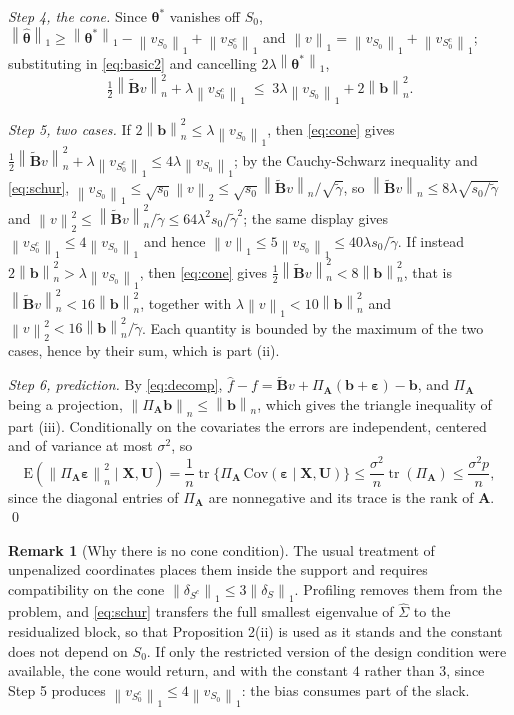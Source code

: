 \documentclass[10pt]{book}
\theoremstyle{definition}
\newtheorem{remark}{Remark}[section]
\newcommand{\E}{\mathrm{E}}
\newcommand{\norm}[1]{\left\lVert #1 \right\rVert}
\newcommand{\normn}[1]{\left\lVert #1 \right\rVert_{n}}
\newcommand{\bX}{\mathbf{X}}
\newcommand{\bU}{\mathbf{U}}
\newcommand{\btheta}{\boldsymbol{\theta}}
\newcommand{\thetastar}{\btheta^{*}}
\newcommand{\thetahat}{\widehat{\btheta}}
\newcommand{\Gramhat}{\widehat{\Sigma}}
\newcommand{\pen}{\lambda}
\newcommand{\Szero}{S_{0}}
\newcommand{\Amat}{\mathbf{A}}
\newcommand{\Bmat}{\mathbf{B}}
\newcommand{\Btil}{\widetilde{\Bmat}}
\newcommand{\PA}{\Pi_{\Amat}}
\newcommand{\bveps}{\boldsymbol{\varepsilon}}
\newcommand{\bb}{\mathbf{b}}
\newcommand{\gtil}{\widetilde{\gamma}}
\DeclareMathOperator{\tr}{tr}
\begin{document}
{\emph{Step 4, the cone.} Since $\thetastar$ vanishes off $\Szero$,
$\norm{\thetahat}_1 \ge \norm{\thetastar}_1 - \norm{v_{\Szero}}_1 +
\norm{v_{\Szero^c}}_1$ and
$\norm{v}_1 = \norm{v_{\Szero}}_1+\norm{v_{\Szero^c}}_1$; substituting in
\eqref{eq:basic2} and cancelling $2\pen\norm{\thetastar}_1$,
\begin{equation}
  \label{eq:cone}
  \tfrac12\normn{\Btil v}^2 + \pen\norm{v_{\Szero^c}}_1
  \;\le\; 3\pen\norm{v_{\Szero}}_1 + 2\normn{\bb}^2 .
\end{equation}

\emph{Step 5, two cases.} If $2\normn{\bb}^2 \le \pen\norm{v_{\Szero}}_1$,
then \eqref{eq:cone} gives
$\tfrac12\normn{\Btil v}^2 + \pen\norm{v_{\Szero^c}}_1 \le
4\pen\norm{v_{\Szero}}_1$; by the Cauchy-Schwarz inequality and
\eqref{eq:schur}, $\norm{v_{\Szero}}_1 \le \sqrt{s_0}\norm{v}_2 \le
\sqrt{s_0}\normn{\Btil v}/\sqrt{\gtil}$, so
$\normn{\Btil v} \le 8\pen\sqrt{s_0/\gtil}$ and
$\norm{v}_2^2 \le \normn{\Btil v}^2/\gtil \le 64\pen^2s_0/\gtil^2$; the same
display gives $\norm{v_{\Szero^c}}_1 \le 4\norm{v_{\Szero}}_1$ and hence
$\norm{v}_1 \le 5\norm{v_{\Szero}}_1 \le 40\pen s_0/\gtil$. If instead
$2\normn{\bb}^2 > \pen\norm{v_{\Szero}}_1$, then \eqref{eq:cone} gives
$\tfrac12\normn{\Btil v}^2 < 8\normn{\bb}^2$, that is
$\normn{\Btil v}^2 < 16\normn{\bb}^2$, together with
$\pen\norm{v}_1 < 10\normn{\bb}^2$ and
$\norm{v}_2^2 < 16\normn{\bb}^2/\gtil$. Each quantity is bounded by the
maximum of the two cases, hence by their sum, which is part (ii).

\emph{Step 6, prediction.} By \eqref{eq:decomp},
$\widehat{f}-f = \Btil v + \PA(\bb+\bveps) - \bb$, and $\PA$ being a
projection, $\normn{\PA\bb} \le \normn{\bb}$, which gives the triangle
inequality of part (iii). Conditionally on the covariates the errors are
independent, centered and of variance at most $\sigma^2$, so
\[
  \E(\normn{\PA\bveps}^2\mid\bX,\bU)
  = \frac1n\tr\{\PA\,\mathrm{Cov}(\bveps\mid\bX,\bU)\}
  \le \frac{\sigma^2}{n}\tr(\PA) \le \frac{\sigma^2p}{n},
\]
since the diagonal entries of $\PA$ are nonnegative and its trace is the rank
of $\Amat$. \qed

\begin{remark}[Why there is no cone condition]
\label{rem:nocone}
The usual treatment of unpenalized coordinates \citep[Section
6.9]{buhlmann2011statistics} places them inside the support and requires
compatibility on the cone $\norm{\delta_{S^c}}_1 \le 3\norm{\delta_S}_1$.
Profiling removes them from the problem, and \eqref{eq:schur} transfers the
full smallest eigenvalue of $\Gramhat$ to the residualized block, so that
Proposition 2(ii) is used as it stands and the constant does not depend on
$\Szero$. If only the restricted version of the design condition were
available, the cone would return, and with the constant $4$ rather than $3$,
since Step 5 produces $\norm{v_{\Szero^c}}_1 \le 4\norm{v_{\Szero}}_1$: the
bias consumes part of the slack.
\end{remark}

}
\end{document}
